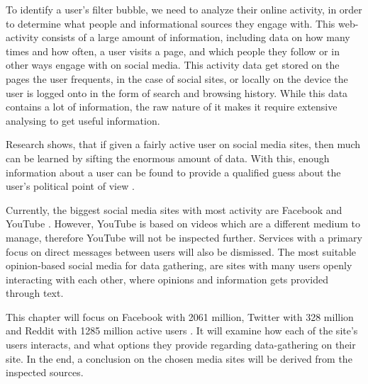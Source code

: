 
To identify a user's filter bubble, we need to analyze their online activity, in
order to determine what people and informational sources they engage with. This
web-activity consists of a large amount of information, including data on how
many times and how often, a user visits a page, and which people they follow or
in other ways engage with on social media. This activity data get stored on the
pages the user frequents, in the case of social sites, or locally on the device
the user is logged onto in the form of search and browsing history. While this
data contains a lot of information, the raw nature of it makes it require
extensive analysing to get useful information.\nl

Research shows, that if given a fairly active user on social media sites, then
much can be learned by sifting the enormous amount of data. With this, enough
information about a user can be found to provide a qualified guess about the
user's political point of view \citep{Personality} .\nl

Currently, the biggest social media sites with most activity are Facebook and
YouTube \citep{SocialMediaStats}. However, YouTube is based on videos which are
a different medium to manage, therefore YouTube will not be inspected further.
Services with a primary focus on direct messages between users will also be
dismissed. The most suitable opinion-based social media for data gathering, are
sites with many users openly interacting with each other, where opinions and
information gets provided through text.\nl

This chapter will focus on Facebook with 2061 million, Twitter with 328 million
and Reddit with 1285 million active users \citep{SocialMediaStats}  \Source.
It will examine how each of the site's users interacts, and what options they provide regarding data-gathering
on their site. In the end, a conclusion on the chosen media sites will be
derived from the inspected sources.